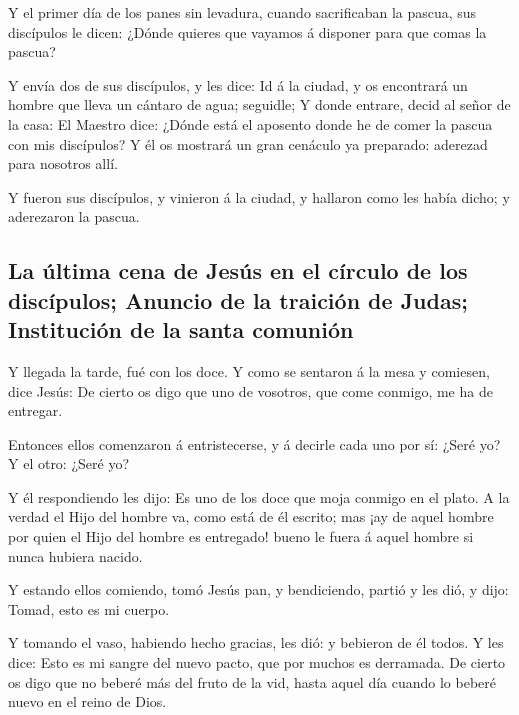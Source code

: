  Y el primer día de los panes sin levadura, cuando
sacrificaban la pascua, sus discípulos le dicen: ¿Dónde quieres que
vayamos á disponer para que comas la pascua?

 Y envía dos de sus discípulos, y les dice: Id á la
ciudad, y os encontrará un hombre que lleva un cántaro de agua;
seguidle;  Y donde entrare, decid al señor de la casa: El
Maestro dice: ¿Dónde está el aposento donde he de comer la pascua con
mis discípulos?  Y él os mostrará un gran cenáculo ya
preparado: aderezad para nosotros allí.

 Y fueron sus discípulos, y vinieron á la ciudad, y
hallaron como les había dicho; y aderezaron la pascua.

\hypertarget{la-uxfaltima-cena-de-jesuxfas-en-el-cuxedrculo-de-los-discuxedpulos-anuncio-de-la-traiciuxf3n-de-judas-instituciuxf3n-de-la-santa-comuniuxf3n}{%
\subsection{La última cena de Jesús en el círculo de los discípulos;
Anuncio de la traición de Judas; Institución de la santa
comunión}\label{la-uxfaltima-cena-de-jesuxfas-en-el-cuxedrculo-de-los-discuxedpulos-anuncio-de-la-traiciuxf3n-de-judas-instituciuxf3n-de-la-santa-comuniuxf3n}}

 Y llegada la tarde, fué con los doce.  Y
como se sentaron á la mesa y comiesen, dice Jesús: De cierto os digo que
uno de vosotros, que come conmigo, me ha de entregar.

 Entonces ellos comenzaron á entristecerse, y á decirle
cada uno por sí: ¿Seré yo? Y el otro: ¿Seré yo?

 Y él respondiendo les dijo: Es uno de los doce que moja
conmigo en el plato.  A la verdad el Hijo del hombre va,
como está de él escrito; mas ¡ay de aquel hombre por quien el Hijo del
hombre es entregado! bueno le fuera á aquel hombre si nunca hubiera
nacido.

 Y estando ellos comiendo, tomó Jesús pan, y bendiciendo,
partió y les dió, y dijo: Tomad, esto es mi cuerpo.

 Y tomando el vaso, habiendo hecho gracias, les dió: y
bebieron de él todos.  Y les dice: Esto es mi sangre del
nuevo pacto, que por muchos es derramada.  De cierto os
digo que no beberé más del fruto de la vid, hasta aquel día cuando lo
beberé nuevo en el reino de Dios.

